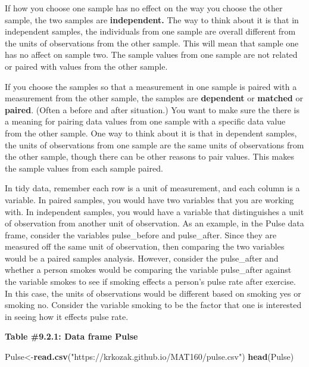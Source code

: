 \documentclass[
]{book}
\newenvironment{Shaded}{\begin{snugshade}}{\end{snugshade}}
\newcommand{\KeywordTok}[1]{\textcolor[rgb]{0.13,0.29,0.53}{\textbf{#1}}}
\newcommand{\NormalTok}[1]{#1}
\newcommand{\StringTok}[1]{\textcolor[rgb]{0.31,0.60,0.02}{#1}}
\begin{document}
If how you choose one sample has no effect on the way you choose the other sample, the two samples are \textbf{independent.} The way to think about it is that in independent samples, the individuals from one sample are overall different from the units of observations from the other sample. This will mean that sample one has no affect on sample two. The sample values from one sample are not related or paired with values from the other sample.

If you choose the samples so that a measurement in one sample is paired with a measurement from the other sample, the samples are \textbf{dependent} or \textbf{matched} or \textbf{paired}. (Often a before and after situation.) You want to make sure the there is a meaning for pairing data values from one sample with a specific data value from the other sample. One way to think about it is that in dependent samples, the units of observations from one sample are the same units of observations from the other sample, though there can be other reasons to pair values. This makes the sample values from each sample paired.

In tidy data, remember each row is a unit of measurement, and each column is a variable. In paired samples, you would have two variables that you are working with. In independent samples, you would have a variable that distinguishes a unit of observation from another unit of observation. As an example, in the Pulse data frame, consider the variables pulse\_before and pulse\_after. Since they are measured off the same unit of observation, then comparing the two variables would be a paired samples analysis. However, consider the pulse\_after and whether a person smokes would be comparing the variable pulse\_after against the variable smokes to see if smoking effects a person's pulse rate after exercise. In this case, the units of observations would be different based on smoking yes or smoking no. Consider the variable smoking to be the factor that one is interested in seeing how it effects pulse rate.

\textbf{Table \#9.2.1: Data frame Pulse}

\begin{Shaded}
\begin{Highlighting}[]
\NormalTok{Pulse<-}\KeywordTok{read.csv}\NormalTok{(}\StringTok{"https://krkozak.github.io/MAT160/pulse.csv"}\NormalTok{)}
\KeywordTok{head}\NormalTok{(Pulse)}
\end{Highlighting}
\end{Shaded}
\end{document}
